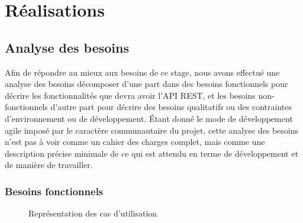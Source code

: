 \documentclass[a4paper, 11pt]{report}
\begin{document}
\chapter{Réalisations}

\section{Analyse des besoins}

Afin de répondre au mieux aux besoins de ce stage, nous avons effectué
une analyse des besoins décomposer d'une part dans des besoins
fonctionnels pour décrire les fonctionnalités que devra avoir l'API
REST, et les besoins non-fonctionnels d'autre part pour décrire des
besoins qualitatifs ou des contraintes d'environnement ou de
développement.  Étant donné le mode de développement agile imposé par
le caractère communautaire du projet, cette analyse des besoins n'est
pas à voir comme un cahier des charges complet, mais comme une
description précise minimale de ce qui est attendu en terme de
développement et de manière de travailler.

\subsection{Besoins fonctionnels}

\begin{figure}
  \centering
  \caption{Représentation des cas d'utilisation}
  \label{fig:needs}
\end{figure}
\end{document}

